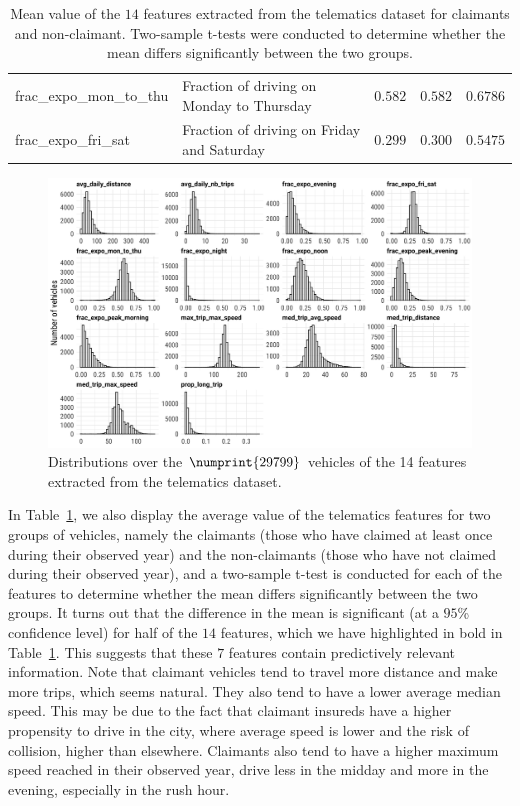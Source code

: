 \documentclass{article}
\begin{document}
\begin{table}[ht]
\begin{adjustbox}{max width = \textwidth}
\begin{tabular}{l l c c r}
            frac\_expo\_mon\_to\_thu & Fraction of driving on Monday to Thursday & $0.582$ & $0.582$ & $0.6786$\\
            frac\_expo\_fri\_sat & Fraction of driving on Friday and Saturday & $0.299$ & $0.300$ & $0.5475$\\
            \bottomrule 
        \end{tabular}
    \end{adjustbox}
    \caption{Mean value of the $14$ features extracted from the telematics dataset for claimants and non-claimant. Two-sample t-tests were conducted to determine whether the mean differs significantly between the two groups.} 
    \label{tab:3} 
\end{table}
\begin{figure}[ht]
    \centering
    \includegraphics[width = \textwidth]{tele_num_vars_plot.png}
    \caption{Distributions over the $\numprint{29799}$ vehicles of the 14 features extracted from the telematics dataset.}
    \label{fig:hist}
\end{figure}In Table~\ref{tab:3}, we also display the average value of the telematics features for two groups of vehicles, namely the claimants (those who have claimed at least once during their observed year) and the non-claimants (those who have not claimed during their observed year), and a two-sample t-test is conducted for each of the features to determine whether the mean differs significantly between the two groups. It turns out that the difference in the mean is significant (at a $95$\% confidence level) for half of the $14$ features, which we have highlighted in bold in Table~\ref{tab:3}. This suggests that these $7$ features contain predictively relevant information. Note that claimant vehicles tend to travel more distance and make more trips, which seems natural. They also tend to have a lower average median speed. This may be due to the fact that claimant insureds have a higher propensity to drive in the city, where average speed is lower and the risk of collision, higher than elsewhere. Claimants also tend to have a higher maximum speed reached in their observed year, drive less in the midday and more in the evening, especially in the rush hour.
\end{document}
